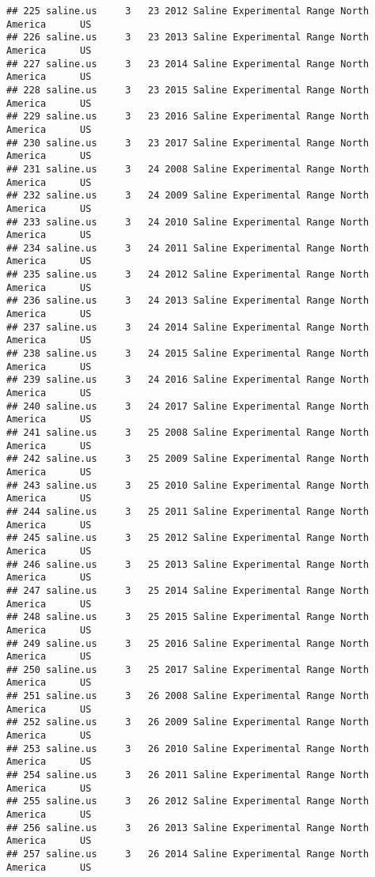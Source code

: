 \documentclass[]{article}
\begin{document}
\begin{verbatim}
## 225 saline.us     3   23 2012 Saline Experimental Range North America      US
## 226 saline.us     3   23 2013 Saline Experimental Range North America      US
## 227 saline.us     3   23 2014 Saline Experimental Range North America      US
## 228 saline.us     3   23 2015 Saline Experimental Range North America      US
## 229 saline.us     3   23 2016 Saline Experimental Range North America      US
## 230 saline.us     3   23 2017 Saline Experimental Range North America      US
## 231 saline.us     3   24 2008 Saline Experimental Range North America      US
## 232 saline.us     3   24 2009 Saline Experimental Range North America      US
## 233 saline.us     3   24 2010 Saline Experimental Range North America      US
## 234 saline.us     3   24 2011 Saline Experimental Range North America      US
## 235 saline.us     3   24 2012 Saline Experimental Range North America      US
## 236 saline.us     3   24 2013 Saline Experimental Range North America      US
## 237 saline.us     3   24 2014 Saline Experimental Range North America      US
## 238 saline.us     3   24 2015 Saline Experimental Range North America      US
## 239 saline.us     3   24 2016 Saline Experimental Range North America      US
## 240 saline.us     3   24 2017 Saline Experimental Range North America      US
## 241 saline.us     3   25 2008 Saline Experimental Range North America      US
## 242 saline.us     3   25 2009 Saline Experimental Range North America      US
## 243 saline.us     3   25 2010 Saline Experimental Range North America      US
## 244 saline.us     3   25 2011 Saline Experimental Range North America      US
## 245 saline.us     3   25 2012 Saline Experimental Range North America      US
## 246 saline.us     3   25 2013 Saline Experimental Range North America      US
## 247 saline.us     3   25 2014 Saline Experimental Range North America      US
## 248 saline.us     3   25 2015 Saline Experimental Range North America      US
## 249 saline.us     3   25 2016 Saline Experimental Range North America      US
## 250 saline.us     3   25 2017 Saline Experimental Range North America      US
## 251 saline.us     3   26 2008 Saline Experimental Range North America      US
## 252 saline.us     3   26 2009 Saline Experimental Range North America      US
## 253 saline.us     3   26 2010 Saline Experimental Range North America      US
## 254 saline.us     3   26 2011 Saline Experimental Range North America      US
## 255 saline.us     3   26 2012 Saline Experimental Range North America      US
## 256 saline.us     3   26 2013 Saline Experimental Range North America      US
## 257 saline.us     3   26 2014 Saline Experimental Range North America      US

\end{verbatim}
\end{document}
